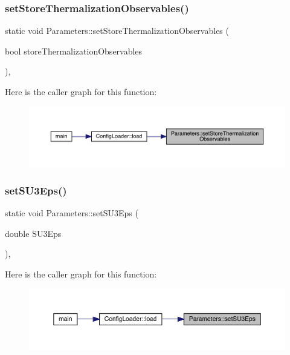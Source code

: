 \subsubsection{\texorpdfstring{setStoreThermalizationObservables()}{setStoreThermalizationObservables()}}
{\footnotesize\ttfamily static void Parameters\+::set\+Store\+Thermalization\+Observables (\begin{DoxyParamCaption}\item[{bool}]{store\+Thermalization\+Observables }\end{DoxyParamCaption})\hspace{0.3cm}{\ttfamily [inline]}, {\ttfamily [static]}}

Here is the caller graph for this function\+:\nopagebreak
\begin{figure}[H]
\begin{center}
\leavevmode
\includegraphics[width=350pt]{class_parameters_a84290346277f15c8241c035b7aa452ad_icgraph}
\end{center}
\end{figure}
\mbox{\label{class_parameters_af882fdb68c96c27f1bb99cebe3aecd21}} 
\subsubsection{\texorpdfstring{setSU3Eps()}{setSU3Eps()}}
{\footnotesize\ttfamily static void Parameters\+::set\+S\+U3\+Eps (\begin{DoxyParamCaption}\item[{double}]{S\+U3\+Eps }\end{DoxyParamCaption})\hspace{0.3cm}{\ttfamily [inline]}, {\ttfamily [static]}}

Here is the caller graph for this function\+:\nopagebreak
\begin{figure}[H]
\begin{center}
\leavevmode
\includegraphics[width=350pt]{class_parameters_af882fdb68c96c27f1bb99cebe3aecd21_icgraph}
\end{center}
\end{figure}
\mbox{\label{class_parameters_a95d3c7f35ed0421419d98faecb2c23e8}} 
